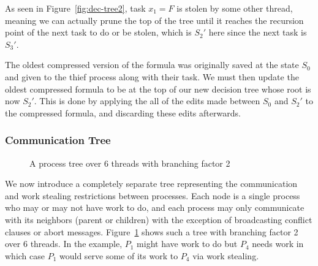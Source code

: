 \documentclass{article}
\begin{document}
As seen in Figure~\ref{fig:dec-tree2}, task $x_1 = F$ is stolen by some other thread, meaning we can actually prune the top of the tree until it reaches the recursion point of the next task to do or be stolen, which is $S_2'$ here since the next task is $S_3'$.

The oldest compressed version of the formula was originally saved at the state $S_0$ and given to the thief process along with their task. We must then update the oldest compressed formula to be at the top of our new decision tree whose root is now $S_2'$. This is done by applying the all of the edits made between $S_0$ and $S_2'$ to the compressed formula, and discarding these edits afterwards.

\subsubsection{Communication Tree}

\begin{figure}
    \begin{center}
    \end{center}
    \caption{A process tree over 6 threads with branching factor 2}
    \label{fig:proc-tree}
\end{figure}

We now introduce a completely separate tree representing the communication and work stealing restrictions between processes. Each node is a single process who may or may not have work to do, and each process may only communicate with its neighbors (parent or children) with the exception of broadcasting conflict clauses or abort messages. Figure~\ref{fig:proc-tree} shows such a tree with branching factor 2 over 6 threads. In the example, $P_1$ might have work to do but $P_4$ needs work in which case $P_1$ would serve some of its work to $P_4$ via work stealing.
\end{document}
